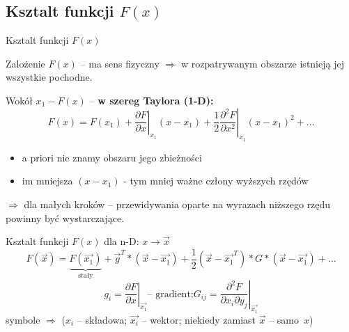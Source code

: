 \subsection{Ksztalt funkcji $ F(x) $}
  \begin{frame}{Ksztalt funkcji $ F(x) $}
    \begin{block}{Zalożenie}
      $ F(x) $ -- ma sens fizyczny $ \Rightarrow $ w rozpatrywanym
      obszarze istnieją jej wszystkie pochodne.
    \end{block}
    Wokół $ x_1 - F(x) $ -- \textbf{w szereg Taylora (1-D):}
    \begin{displaymath}
      F(x) = F(x_1) + \left. \frac{\partial F}{\partial x} \right|_{x_1}(x - x_1) +
      \left. \frac{1}{2} \frac{\partial^2 F}{\partial x^2} \right|_{x_1}(x - x_1)^2 +
      \dots
    \end{displaymath}
    \begin{itemize}
      \item a priori nie znamy obszaru jego zbieżności
      \item im mniejsza $ (x - x_1) $ - tym mniej ważne człony
      wyższych rzędów
    \end{itemize}
    $ \Rightarrow $ dla małych kroków -- przewidywania oparte
    na wyrazach niższego rzędu powinny być wystarczające.

  \end{frame}

  \begin{frame}{Ksztalt funkcji $ F(x) $}
    dla n-D: $ x \to \vec{x} $
    \begin{displaymath}
      F(\vec{x}) = \underbrace{F(\vec{x_1})}_{\text{stały}} +
      \vec{g}^T * (\vec{x} - \vec{x_1}) +
      \frac{1}{2}(\vec{x} - \vec{x_1}^T) * G * (\vec{x} - \vec{x_1}) + \dots
    \end{displaymath}
    \begin{displaymath}
      g_i = \left. \frac{\partial F}{\partial x} \right|_{\vec{x_1}} \text{-- gradient;}
      G_{ij} = \left. \frac{\partial^2 F}{\partial x_i \partial y_j} \right|_{\vec{x_1}}
    \end{displaymath}
    symbole $ \Rightarrow $ ($ x_i $ -- składowa; $ \vec{x_i} $
    -- wektor; niekiedy zamiast $ \vec{x} $ -- samo~$ x $)

  \end{frame}

